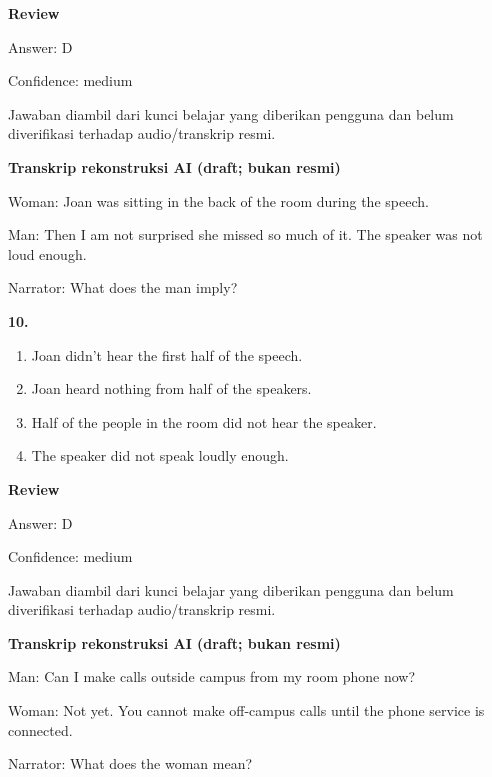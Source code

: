 \documentclass[12pt]{article}
\begin{document}
\par
\begingroup
\setlength{\parskip}{0pt}
\setlength{\parindent}{0pt}
\textbf{Review}\par
Answer: D\par
Confidence: medium\par
Jawaban diambil dari kunci belajar yang diberikan pengguna dan belum diverifikasi terhadap audio/transkrip resmi.\par
\endgroup
\par
\vspace{0.25\baselineskip}
\begin{exampleblock}
\textbf{Transkrip rekonstruksi AI (draft; bukan resmi)}\par
Woman: Joan was sitting in the back of the room during the speech.\par
Man: Then I am not surprised she missed so much of it. The speaker was not loud enough.\par
Narrator: What does the man imply?\par
\end{exampleblock}
\noindent\textbf{10.}
\begin{enumerate}[label=(\Alph*),leftmargin=*,itemsep=0.2em]
\item Joan didn't hear the first half of the speech.
\item Joan heard nothing from half of the speakers.
\item Half of the people in the room did not hear the speaker.
\item The speaker did not speak loudly enough.
\end{enumerate}
\par
\begingroup
\setlength{\parskip}{0pt}
\setlength{\parindent}{0pt}
\textbf{Review}\par
Answer: D\par
Confidence: medium\par
Jawaban diambil dari kunci belajar yang diberikan pengguna dan belum diverifikasi terhadap audio/transkrip resmi.\par
\endgroup
\par
\vspace{0.25\baselineskip}
\begin{exampleblock}
\textbf{Transkrip rekonstruksi AI (draft; bukan resmi)}\par
Man: Can I make calls outside campus from my room phone now?\par
Woman: Not yet. You cannot make off-campus calls until the phone service is connected.\par
Narrator: What does the woman mean?\par
\end{exampleblock}
\end{document}
